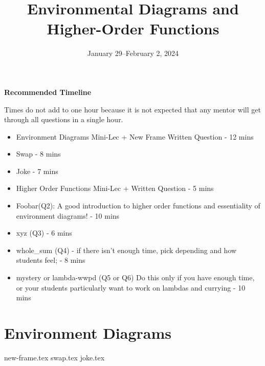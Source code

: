 \documentclass{exam}
\title{Environmental Diagrams \titlebreak and Higher-Order Functions}
\date{January 29--February 2, 2024}
\begin{document}
\maketitle

\begin{blocksection}
\begin{guide}
\textbf{Recommended Timeline}

Times do not add to one hour because it is not expected that any mentor will get through all questions in a single hour. 

\begin{itemize}
    \item Environment Diagrams Mini-Lec + New Frame Written Question - 12 mins
    \item Swap - 8 mins
    \item Joke - 7 mins
    \item Higher Order Functions Mini-Lec + Written Question - 5 mins
    \item Foobar(Q2): A good introduction to higher order functions and essentiality of environment diagrams! - 10 mins
    \item xyz (Q3) - 6 mins
    \item whole\_sum (Q4) - if there isn't enough time, pick depending and how students feel; - 8 mins
    \item mystery or lambda-wwpd (Q5 or Q6) Do this only if you have enough time, or your students particularly want to work on lambdas and currying - 10 mins
\end{itemize}
\end{guide}
\end{blocksection}


\section{Environment Diagrams}

\begin{questions}
{new-frame.tex}
{swap.tex}
{joke.tex}
\end{questions}
\end{document}

